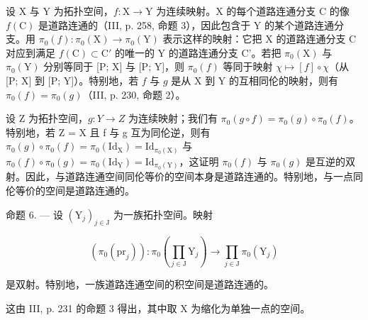设 X 与 Y 为拓扑空间，\(f\colon\mathrm{X}\to\mathrm{Y}\) 为连续映射。X 的每个道路连通分支 C 的像 \(f(\mathrm{C})\) 是道路连通的（III, p. 258, 命题 3），因此包含于 Y 的某个道路连通分支。用 \(\pi_{0}(f)\colon\pi_{0}(\mathrm{X})\to\pi_{0}(\mathrm{Y})\) 表示这样的映射：它把 X 的道路连通分支 C 对应到满足 \(f(\mathrm{C})\subset\mathrm{C}'\) 的唯一的 Y 的道路连通分支 C'。若把 \(\pi_0(\mathrm{X})\) 与 \(\pi_0(\mathrm{Y})\) 分别等同于 {[}P; X{]} 与 {[}P; Y{]}，则 \(\pi_0(f)\) 等同于映射 \(\chi \mapsto [f] \circ \chi\)（从 {[}P; X{]} 到 {[}P; Y{]}）。特别地，若 \(f\) 与 \(g\) 是从 X 到 Y 的互相同伦的映射，则有 \(\pi_0(f) = \pi_0(g)\)（III, p. 230, 命题 2）。

设 Z 为拓扑空间，\(g: Y \to Z\) 为连续映射；我们有 \(\pi_{0}(g \circ f) = \pi_{0}(g) \circ \pi_{0}(f)\)。特别地，若 Z = X 且 f 与 g 互为同伦逆，则有 \(\pi_{0}(g) \circ \pi_{0}(f) = \pi_{0}(\mathrm{Id}_{\mathrm{X}}) = \mathrm{Id}_{\pi_{0}(\mathrm{X})}\) 与 \(\pi_{0}(f) \circ \pi_{0}(g) = \pi_{0}(\mathrm{Id}_{\mathrm{Y}}) = \mathrm{Id}_{\pi_{0}(\mathrm{Y})}\)，这证明 \(\pi_{0}(f)\) 与 \(\pi_{0}(g)\) 是互逆的双射。因此，与道路连通空间同伦等价的空间本身是道路连通的。特别地，与一点同伦等价的空间是道路连通的。

命题 6. --- 设 \((\mathrm{Y}_{j})_{j\in\mathrm{J}}\) 为一族拓扑空间。映射

\[
(\pi_ {0} (\mathrm{pr} _ {j})) \colon \pi_ {0} (\prod_ {j \in \mathrm{J}} \mathrm{Y} _ {j}) \to \prod_ {j \in \mathrm{J}} \pi_ {0} (\mathrm{Y} _ {j})
\]

是双射。特别地，一族道路连通空间的积空间是道路连通的。

这由 III, p. 231 的命题 3 得出，其中取 X 为缩化为单独一点的空间。

